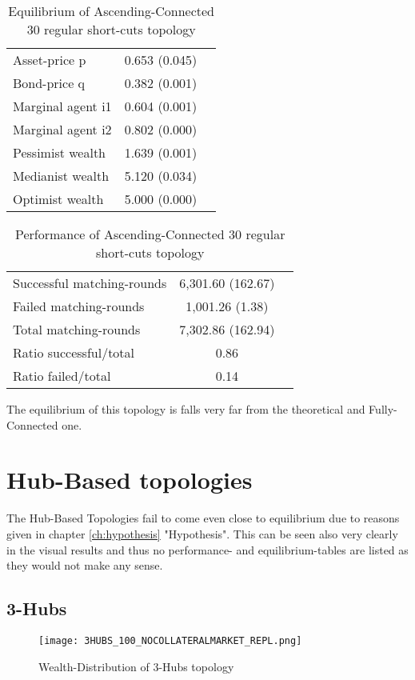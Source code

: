 \documentclass[Bachelorarbeit.tex]{subfiles}
\begin{document}
\begin{table}[H]
	\caption{Equilibrium of Ascending-Connected 30 regular short-cuts topology}
	\centering
	\begin{tabular} { l c r }
		\hline
		Asset-price p & 0.653 (0.045) \\
		Bond-price q & 0.382 (0.001) \\
		Marginal agent i1 & 0.604 (0.001) \\
		Marginal agent i2 & 0.802 (0.000) \\
		\hline
		Pessimist wealth & 1.639 (0.001) \\
		Medianist wealth & 5.120 (0.034) \\
		Optimist wealth & 5.000 (0.000) \\
		\hline
	\end{tabular}
\end{table} 

\begin{table}[H]
	\caption{Performance of Ascending-Connected 30 regular short-cuts topology}
	\centering
	\begin{tabular} { l c r }
		\hline
		Successful matching-rounds & 6,301.60 (162.67) \\
		Failed matching-rounds & 1,001.26 (1.38) \\
		Total matching-rounds & 7,302.86 (162.94) \\
		\hline
		Ratio successful/total & 0.86 \\
		Ratio failed/total & 0.14 \\
		\hline
	\end{tabular}
\end{table}

The equilibrium of this topology is falls very far from the theoretical and Fully-Connected one.

\section{Hub-Based topologies} 
The Hub-Based Topologies fail to come even close to equilibrium due to reasons given in chapter \ref{ch:hypothesis} "Hypothesis". This can be seen also very clearly in the visual results and thus no performance- and equilibrium-tables are listed as they would not make any sense.

\subsection{3-Hubs}
\begin{figure}[H]
	\centering
  \texttt{[image: 3HUBS\_100\_NOCOLLATERALMARKET\_REPL.png]}
	\caption{Wealth-Distribution of 3-Hubs topology}
	\label{fig:wealth_3HUBS_100_NOCOLLATERALMARKET_REPL}
\end{figure}
\end{document}

